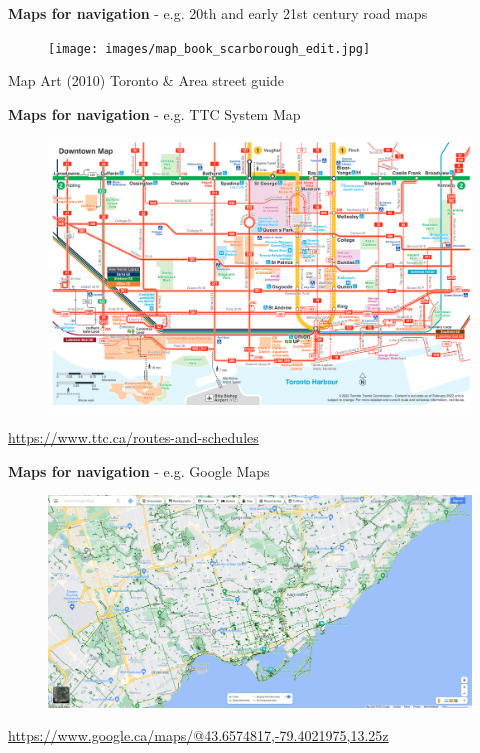 \documentclass[aspectratio=169]{beamer}
\begin{document}
\begin{frame}
	\textbf{Maps for navigation} - e.g. 20th and early 21st century road maps 
	
	\begin{figure}
		\centering
		\texttt{[image: images/map\_book\_scarborough\_edit.jpg]}
	\end{figure}
	
	\tiny Map Art (2010) Toronto \& Area street guide
	
\end{frame}


\begin{frame}
	\textbf{Maps for navigation} - e.g. TTC System Map
	
	\begin{figure}
		\centering
		\includegraphics[width=0.86\linewidth]{images/ttc_downtown.png}
	\end{figure}
	
	\tiny \url{https://www.ttc.ca/routes-and-schedules}
\end{frame}




\begin{frame}
	\textbf{Maps for navigation} - e.g. Google Maps
	
	\begin{figure}
		\centering
		\includegraphics[width=1\linewidth]{images/google_maps_toronto.png}
	\end{figure}
	
	\tiny \url{https://www.google.ca/maps/@43.6574817,-79.4021975,13.25z}
\end{frame}
\end{document}
